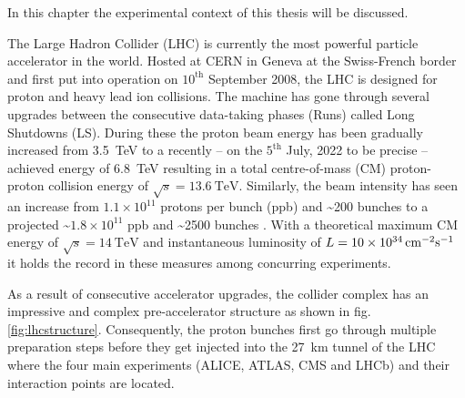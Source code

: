 \label{ch:experiment}

In this chapter the experimental context of this thesis will be discussed. 

\label{sec:theory}

The Large Hadron Collider (LHC) is currently the most powerful particle accelerator in the world. Hosted at CERN in Geneva at the Swiss-French border and first put into operation on $\text{10}^\text{th}$ September 2008, the LHC is designed for proton and heavy lead ion collisions. The machine has gone through several upgrades between the consecutive data-taking phases (Runs) called Long Shutdowns (LS). During these the proton beam energy has been gradually increased from \SI{3.5}{\tera\electronvolt} to a recently -- on the $\text{5}^{\text{th}}$ July, 2022 to be precise -- achieved energy of \SI{6.8}{\tera\electronvolt} \cite{Alici:2773265} resulting in a total centre-of-mass (CM) proton-proton collision energy of $\sqrt{s} = \SI{13.6}{\tera\electronvolt}$. Similarly, the beam intensity has seen an increase from $1.1 \times 10^{11}$ protons per bunch (ppb) and \textasciitilde200 bunches to a projected \textasciitilde$1.8 \times 10^{11}$ ppb and \textasciitilde2500 bunches \cite{Fartoukh:2790409, Karastathis:2750302}. With a theoretical maximum CM energy of $\sqrt{s} = \SI{14}{\tera\electronvolt}$ and instantaneous luminosity of $L = \SI{10d34}{\centi\meter^{-2}\second^{-1}}$ it holds the record in these measures among concurring experiments.

As a result of consecutive accelerator upgrades, the collider complex has an impressive and complex pre-accelerator structure as shown in fig. \ref{fig:lhcstructure}. Consequently, the proton bunches first go through multiple preparation steps before they get injected into the \SI{27}{\kilo\meter} tunnel of the LHC where the four main experiments (ALICE, ATLAS, CMS and LHCb) and their interaction points are located. 

